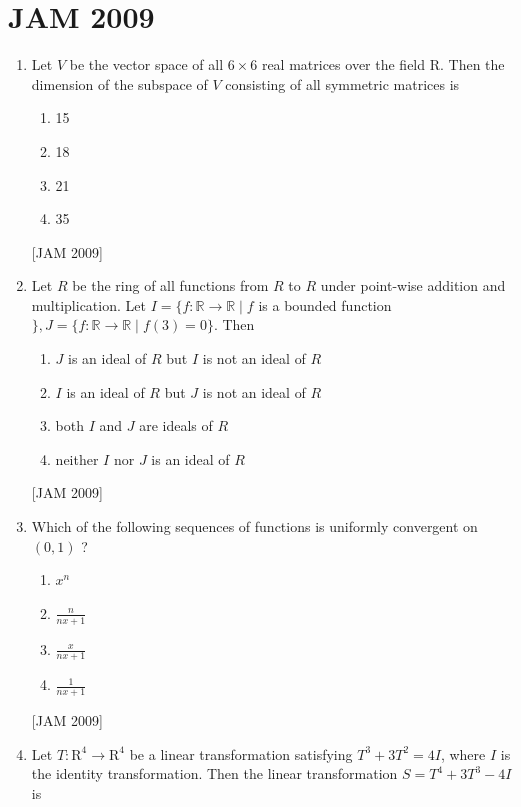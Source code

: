 \section{JAM 2009}


\begin{enumerate}

\item  Let $V$ be the vector space of all $6 \times 6$ real matrices over the field $\mathrm{R}$. Then the dimension of the subspace of $V$ consisting of all symmetric matrices is 
\begin{enumerate}
   \item 15 
\item 18 
\item 21 
\item 35 
\end{enumerate}
\hfill [JAM 2009]




\item  Let $R$ be the ring of all functions from $R$ to $R$ under point-wise addition and multiplication. Let $I=\{f: \mathbb{R} \rightarrow \mathbb{R} \mid f$ is a bounded function $\}, J=\{f: \mathbb{R} \rightarrow \mathbb{R} \mid f(3)=0\}$. Then 
\begin{enumerate}
   
\item $J$ is an ideal of $R$ but $I$ is not an ideal of $R$ 
\item $I$ is an ideal of $R$ but $J$ is not an ideal of $R$ 
\item both $I$ and $J$ are ideals of $R$ 
\item neither $I$ nor $J$ is an ideal of $R$ 
\end{enumerate}
\hfill [JAM 2009]



\item  Which of the following sequences of functions is uniformly convergent on $(0,1)$ ? 
\begin{enumerate}
    \item $x^{n}$ 
\item $\frac{n}{n x+1}$ 
\item $\frac{x}{n x+1}$ 
\item $\frac{1}{n x+1}$
\end{enumerate}
\hfill [JAM 2009]




\item  Let $T: \mathrm{R}^{4} \rightarrow \mathrm{R}^{4}$ be a linear transformation satisfying $T^{3}+3 T^{2}=4 I$, where $I$ is the identity transformation. Then the linear transformation $S=T^{4}+3 T^{3}-4 I$ is 
\begin{enumerate}
    

\end{enumerate}
\end{enumerate}
